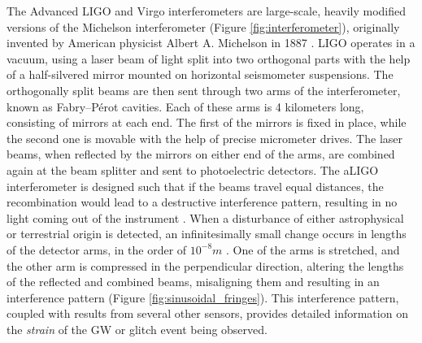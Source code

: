 \documentclass[12pt]{article}
\begin{document}
\medskip
\noindent The Advanced LIGO and Virgo interferometers are large-scale, heavily modified versions of the Michelson interferometer (Figure \ref{fig:interferometer}), originally invented by American physicist Albert A. Michelson in 1887 \cite{weiss_report_1972,collaboration_gwtc-3_2023}. LIGO operates in a vacuum, using a laser beam of light split into two orthogonal parts with the help of a half-silvered mirror mounted on horizontal seismometer suspensions. The orthogonally split beams are then sent through two arms of the interferometer, known as Fabry–Pérot cavities. Each of these arms is 4 kilometers long, consisting of mirrors at each end. The first of the mirrors is fixed in place, while the second one is movable with the help of precise micrometer drives. The laser beams, when reflected by the mirrors on either end of the arms, are combined again at the beam splitter and sent to photoelectric detectors. The aLIGO interferometer is designed such that if the beams travel equal distances, the recombination would lead to a destructive interference pattern, resulting in no light coming out of the instrument \cite{ligo_what_interferometer}. When a disturbance of either astrophysical or terrestrial origin is detected, an infinitesimally small change occurs in lengths of the detector arms, in the order of $10^{-8}m$ \cite{ghonge_assessing_2024}. One of the arms is stretched, and the other arm is compressed in the perpendicular direction, altering the lengths of the reflected and combined beams, misaligning them and resulting in an interference pattern (Figure \ref{fig:sinusoidal_fringes}). This interference pattern, coupled with results from several other sensors, provides detailed information on the \textit{strain} of the GW or glitch event being observed.
\end{document}
